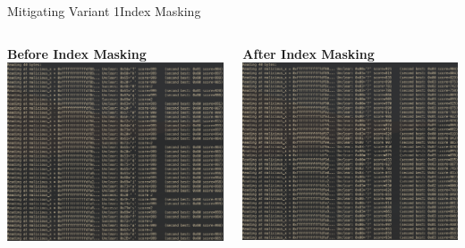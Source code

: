 \documentclass[10pt, dvipsnames, aspectratio=169]{beamer}
\begin{document}
\begin{frame}[c, fragile]{Mitigating Variant 1}{Index Masking}
  \begin{columns}
    \begin{column}{0.5\textwidth}
      {\bf Before Index Masking}
      \includegraphics[width=\columnwidth]{figs/screenshots/poc.png}
    \end{column}
    \begin{column}{0.5\textwidth}
      {\bf After Index Masking}
      \includegraphics[width=\columnwidth]{figs/screenshots/poc_patched.png}
    \end{column}
  \end{columns}
\end{frame}
\end{document}
